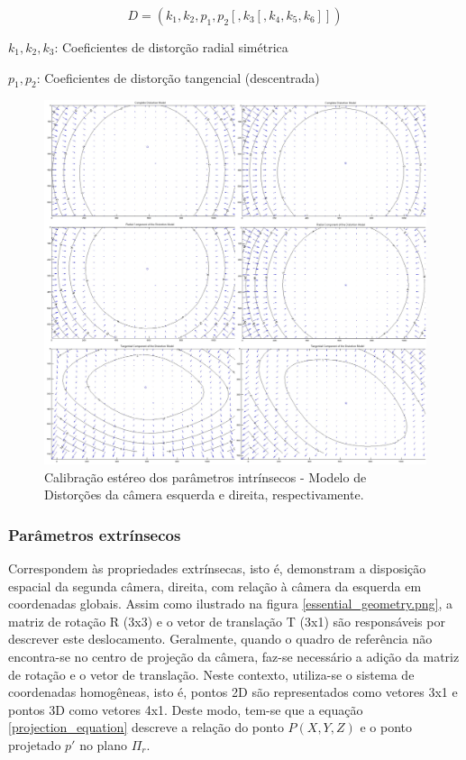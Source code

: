 \begin{equation}
  D = (k_1,k_2,p_1,p_2[,k_3[,k_4,k_5,k_6]])
\end{equation}

\begin{center}
  $k_1,k_2,k_3$: Coeficientes de distorção radial simétrica
  
  $p_1,p_2$: Coeficientes de distorção tangencial (descentrada)
\end{center}

\begin{figure}[H]
 	\centering
 	\includegraphics[scale=0.20]{./Resources/distortion/lenses_distortion.jpg}
 	\caption{Calibração estéreo dos parâmetros intrínsecos - Modelo de Distorções da câmera esquerda e direita, respectivamente.}
 	\label{lenses_distortion}
\end{figure}


\subsubsection{Parâmetros extrínsecos}
Correspondem às propriedades extrínsecas, isto é, demonstram a disposição espacial da segunda câmera, direita, com relação à câmera da esquerda em coordenadas globais. Assim como ilustrado na figura \ref{essential_geometry.png}, a matriz de rotação R (3x3) e o vetor de translação T (3x1) são responsáveis por descrever este deslocamento. Geralmente, quando o quadro de referência não encontra-se no centro de projeção da câmera, faz-se necessário a adição da matriz de rotação e o vetor de translação. Neste contexto, utiliza-se o sistema de coordenadas homogêneas, isto é, pontos 2D são representados como vetores 3x1 e pontos 3D como vetores 4x1. Deste modo, tem-se que a equação \ref{projection_equation} descreve a relação do ponto $P(X,Y,Z)$ e o ponto projetado $p'$ no plano $\Pi_r$\cite{RobertLaganiere}.


